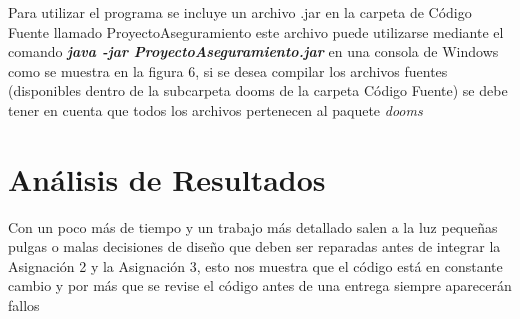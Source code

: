 \documentclass[10pt,journal,compsoc]{IEEEtran}
\begin{document}
\par Para utilizar el programa se incluye un archivo .jar en la carpeta de Código Fuente llamado ProyectoAseguramiento este archivo puede utilizarse mediante el comando \textit{\textbf{java -jar ProyectoAseguramiento.jar}} en una consola de Windows como se muestra en la figura 6, si se desea compilar los archivos fuentes (disponibles dentro de la subcarpeta dooms de la carpeta Código Fuente) se debe tener en cuenta que todos los archivos pertenecen al paquete \textit{dooms}

\section{Análisis de Resultados}
\par Con un poco más de tiempo y un trabajo más detallado salen a la luz pequeñas pulgas o malas decisiones de diseño que deben ser reparadas antes de integrar la Asignación 2 y la Asignación 3, esto nos muestra que el código está en constante cambio y por más que se revise el código antes de una entrega siempre aparecerán fallos
\newpage
\onecolumn
\appendices
\end{document}
